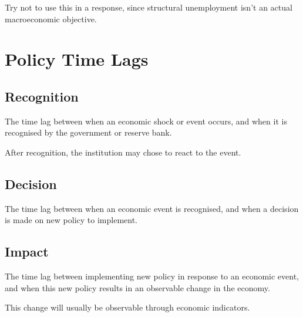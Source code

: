 \documentclass[a4paper,11pt]{article}
\begin{document}
Try not to use this in a response, since structural unemployment isn't an actual
macroeconomic objective.




\section{Policy Time Lags}

\subsection{Recognition}

The time lag between when an economic shock or event occurs, and when it is
recognised by the government or reserve bank.

After recognition, the institution may chose to react to the event.


\subsection{Decision}

The time lag between when an economic event is recognised, and when a decision
is made on new policy to implement.


\subsection{Impact}

The time lag between implementing new policy in response to an economic event,
and when this new policy results in an observable change in the economy.

This change will usually be observable through economic indicators.
\end{document}
